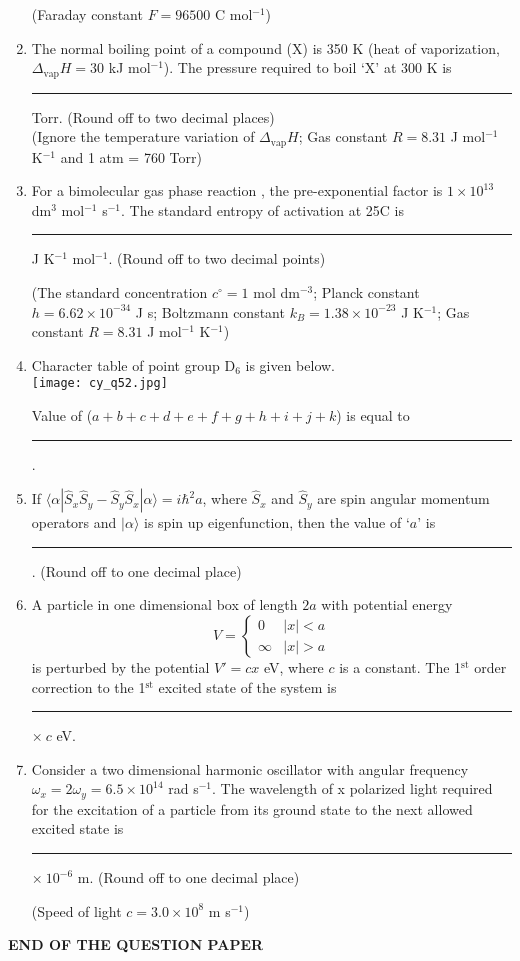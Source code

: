 \documentclass[12pt]{article}
\begin{document}
\begin{enumerate}[label=Q.\arabic*]
	\vspace{1ex}
(Faraday constant $F = 96500$ C mol$^{-1}$)

	\item The normal boiling point of a compound (X) is 350 K (heat of vaporization, $\Delta_{\text{vap}}H = 30$ kJ mol$^{-1}$). The pressure required to boil ‘X’ at 300 K is \rule{2cm}{0.15mm} Torr. (Round off to two decimal places)\\[1ex]
	(Ignore the temperature variation of $\Delta_{\text{vap}}H$; Gas constant $R = 8.31$ J mol$^{-1}$ K$^{-1}$ and 1 atm = 760 Torr)
\item For a bimolecular gas phase reaction , the pre-exponential factor is $1 \times 10^{13}$ dm$^3$ mol$^{-1}$ s$^{-1}$. The standard entropy of activation at 25\textdegree C is \rule{2cm}{0.15mm} J K$^{-1}$ mol$^{-1}$. (Round off to two decimal points)

	\vspace{1ex}
	(The standard concentration $c^\circ = 1$ mol dm$^{-3}$; Planck constant $h = 6.62 \times 10^{-34}$ J s; Boltzmann constant $k_B = 1.38 \times 10^{-23}$ J K$^{-1}$; Gas constant $R = 8.31$ J mol$^{-1}$ K$^{-1}$)

	\item Character table of point group D$_6$ is given below.\\[1ex]
	\texttt{[image: cy\_q52.jpg]}

	\vspace{1ex}
	Value of ($a + b + c + d + e + f + g + h + i + j + k$) is equal to \rule{2cm}{0.15mm}.
\item If $\langle \alpha | \hat{S}_x \hat{S}_y - \hat{S}_y \hat{S}_x | \alpha \rangle = i \hbar^2 a$, where $\hat{S}_x$ and $\hat{S}_y$ are spin angular momentum operators and $|\alpha\rangle$ is spin up eigenfunction, then the value of ‘$a$’ is \rule{2cm}{0.15mm}. (Round off to one decimal place)

	\item A particle in one dimensional box of length $2a$ with potential energy
	\[
		V =
		\begin{cases}
		0 & |x| < a \\
			\infty & |x| > a
			\end{cases}
			\]
			is perturbed by the potential $V' = cx$ eV, where $c$ is a constant. The 1$^{\text{st}}$ order correction to the 1$^{\text{st}}$ excited state of the system is \rule{2cm}{0.15mm} $\times~c$ eV.

\item Consider a two dimensional harmonic oscillator with angular frequency $\omega_x = 2\omega_y = 6.5 \times 10^{14}$ rad s$^{-1}$. The wavelength of x polarized light required for the excitation of a particle from its ground state to the next allowed excited state is \rule{2cm}{0.15mm} $\times~10^{-6}$ m. (Round off to one decimal place)

	\vspace{1ex}
(Speed of light $c = 3.0 \times 10^8$ m s$^{-1}$)

	\end{enumerate}
\begin{center}{
		\textbf{END OF THE QUESTION PAPER}
}\end{center}
	
\end{document}
